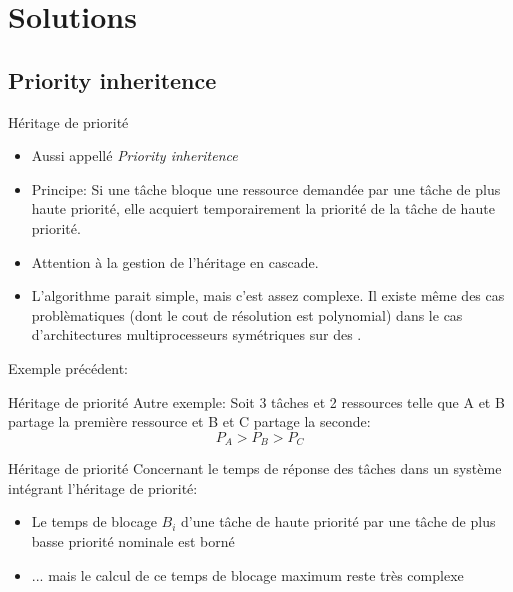 \section{Solutions}

\subsection{Priority inheritence}

\begin{frame}{Héritage de priorité}
  \begin{itemize}
  \item Aussi appellé \emph{Priority inheritence}
  \item Principe: Si  une tâche bloque une ressource  demandée par une
    tâche  de plus  haute  priorité, elle  acquiert temporairement  la
    priorité de la tâche de haute priorité.
  \item Attention à la gestion de l'héritage en cascade.
  \item  L'algorithme parait  simple,  mais c'est  assez complexe.  Il
    existe même des cas problèmatiques (dont le cout de résolution est
    polynomial)   dans   le   cas   d'architectures   multiprocesseurs
    symétriques sur des .
  \end{itemize}
  Exemple précédent:
  \begin{center}
    
  \end{center}
\end{frame}

\begin{frame}{Héritage de priorité}
  Autre exemple:
  Soit 3 tâches et 2 ressources telle que A et B partage la première ressource et B et C partage la seconde:
  $$P_A > P_B > P_C$$
  \begin{center}
    
  \end{center}
\end{frame}

\begin{frame}{Héritage de priorité}
  Concernant le temps de réponse  des tâches dans un système intégrant
  l'héritage de priorité:
  \begin{itemize}
  \item Le  temps de blocage $B_i$  d'une tâche de  haute priorité par
    une tâche de plus basse priorité nominale est borné
  \item ...  mais le calcul de  ce temps de blocage maximum reste très
    complexe
  \end{itemize}
\end{frame}


